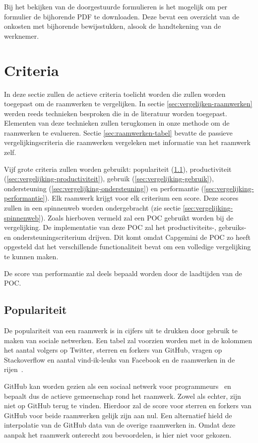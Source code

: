 Bij het bekijken van de doorgestuurde formulieren is het mogelijk om per formulier de bijhorende PDF te downloaden. 
Deze bevat een overzicht van de onkosten met bijhorende bewijsstukken, alsook de handtekening van de werknemer.

\section{Criteria}
\label{sec:vergelijking-criteria}

In deze sectie zullen de actieve criteria toelicht worden die zullen worden toegepast om de raamwerken te vergelijken.
In sectie \ref{sec:vergelijken-raamwerken} werden reeds technieken besproken die in de literatuur worden toegepast.
Elementen van deze technieken zullen terugkomen in onze methode om de raamwerken te evalueren.
Sectie \ref{sec:raamwerken-tabel} bevatte de passieve vergelijkingscriteria die raamwerken vergeleken met informatie van het raamwerk zelf.

Vijf grote criteria zullen worden gebruikt: populariteit (\ref{sec:vergelijking-populariteit}), productiviteit (\ref{sec:vergelijking-productiviteit}), gebruik (\ref{sec:vergelijking-gebruik}), ondersteuning (\ref{sec:vergelijking-ondersteuning}) en performantie (\ref{sec:vergelijking-performantie}). 
Elk raamwerk krijgt voor elk criterium een score. 
Deze scores zullen in een spinnenweb worden ondergebracht (zie sectie \ref{sec:vergelijking-spinnenweb}).
Zoals hierboven vermeld zal een POC gebruikt worden bij de vergelijking.
De implementatie van deze POC zal het productiviteits-, gebruiks- en ondersteuningscriterium drijven.  
Dit komt omdat Capgemini de POC zo heeft opgesteld dat het verschillende functionaliteit bevat om een volledige vergelijking te kunnen maken.

De score van performantie zal deels bepaald worden door de laadtijden van de POC.

\subsection{Populariteit}
\label{sec:vergelijking-populariteit}
De populariteit van een raamwerk is in cijfers uit te drukken door gebruik te maken van sociale netwerken. 
Een tabel zal voorzien worden met in de kolommen het aantal volgers op Twitter, sterren en forkers van GitHub,  vragen op Stackoverflow en aantal vind-ik-leuks van Facebook en de raamwerken in de rijen~\cite{Sarrafi2012a,Ayuso2012}. 

GitHub kan worden gezien als een sociaal netwerk voor programmeurs~\cite{Catone2008} en bepaalt dus de actieve gemeenschap rond het raamwerk.
Zowel \st{} als \kendo{} echter, zijn niet op GitHub terug te vinden.
Hierdoor zal de score voor sterren en forkers van GitHub voor beide raamwerken gelijk zijn aan nul.
Een alternatief hield de interpolatie van de GitHub data van de overige raamwerken in.
Omdat deze aanpak het raamwerk onterecht zou bevoordelen, is hier niet voor gekozen.


